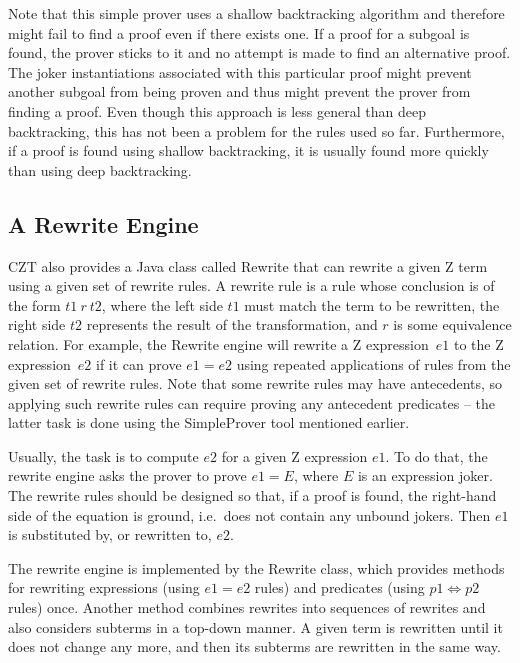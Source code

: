 \documentclass{entcs}
\begin{document}
Note that this simple prover uses a shallow backtracking algorithm and
therefore might fail to find a proof even if there exists one.  If a
proof for a subgoal is found, the prover sticks to it and no attempt
is made to find an alternative proof.  The joker instantiations
associated with this particular proof might prevent another subgoal
from being proven and thus might prevent the prover from finding a
proof.  Even though this approach is less general than deep
backtracking, this has not been a problem for the rules used so far.
Furthermore, if a proof is found using shallow backtracking, it is
usually found more quickly than using deep backtracking.

\subsection{A Rewrite Engine} \label{sec:rewrite}

CZT also provides a Java class called Rewrite that can rewrite a given
Z term using a given set of rewrite rules.  A rewrite rule is a rule
whose conclusion is of the form $t1~r~t2$, where the left side $t1$
must match the term to be rewritten, the right side $t2$ represents
the result of the transformation, and $r$ is some equivalence
relation.  For example, the Rewrite engine will rewrite a Z
expression~$e1$ to the Z expression~$e2$ if it can prove $e1 = e2$
using repeated applications of rules from the given set of rewrite
rules.  Note that some rewrite rules may have antecedents, so applying
such rewrite rules can require proving any antecedent predicates --
the latter task is done using the SimpleProver tool mentioned earlier.

Usually, the task is to compute $e2$ for a given Z expression $e1$.
To do that, the rewrite engine asks the prover to prove $e1 = E$,
where $E$ is an expression joker.  The rewrite rules should be
designed so that, if a proof is found, the right-hand side of the
equation is ground, i.e.\ does not contain any unbound jokers.  Then
$e1$ is substituted by, or rewritten to, $e2$.

The rewrite engine is implemented by the Rewrite class, which provides
methods for rewriting expressions (using $e1 = e2$ rules) and
predicates (using $p1 \iff p2$ rules) once.  Another method combines
rewrites into sequences of rewrites and also considers subterms in a
top-down manner.  A given term is rewritten until it does not change
any more, and then its subterms are rewritten in the same way.
\end{document}
